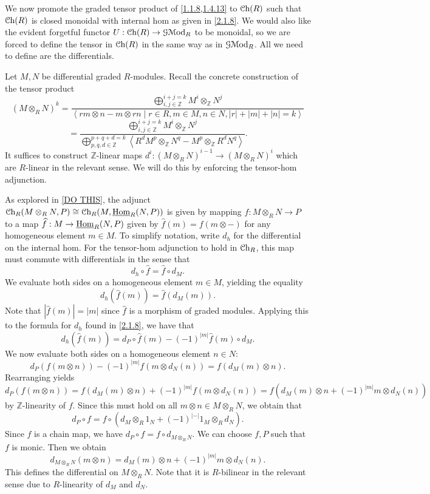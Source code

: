 \begin{construction}\label{2.1.10}
	We now promote the graded tensor product of \cref{1.1.8,1.4.13} to $\mathcal{C}\mathrm{h}(R) $ such that $\mathcal{C}\mathrm{h}(R) $ is closed monoidal with internal hom as given in \cref{2.1.8}. We would also like the evident forgetful functor $U : \mathcal{C}\mathrm{h}(R)  \to \mathcal{G} \mathcal{M}\mathrm{od} _R$ to be monoidal, so we are forced to define the tensor in $\mathcal{C}\mathrm{h}(R) $ in the same way as in $\mathcal{G} \mathcal{M}\mathrm{od} _R$. All we need to define are the differentials.

	Let $M,N$ be differential graded $R$-modules. Recall the concrete construction of the tensor product
	\[
		\left( M\otimes _RN \right) ^k = \frac{\bigoplus_{i,j\in\mathbb{Z} } ^{i+j=k} M^i\otimes _\mathbb{Z} N^j}{\left\langle r m\otimes n - m\otimes rn\mid r\in R,m\in M,n\in N,\left| r \right| +\left| m \right| +\left| n \right| =k \right\rangle } 
	\]
	\[
		=\frac{\displaystyle{\bigoplus_{i,j\in\mathbb{Z} } ^{i+j=k} M^i\otimes _\mathbb{Z} N^j}}{\displaystyle{\bigoplus_{p,q,d\in \mathbb{Z} } ^{p+q+d=k} \left\langle R^dM^p\otimes _\mathbb{Z} N^q - M^p \otimes _\mathbb{Z} R^dN^q\right\rangle}} 
	.\]
	It suffices to construct $\mathbb{Z} $-linear maps $d^i : (M\otimes _RN)^{i-1}  \to (M\otimes _RN)^i$ which are $R$-linear in the relevant sense. We will do this by enforcing the tensor-hom adjunction.

	As explored in \cref{DO THIS}, the adjunct $\mathcal{C}\mathrm{h}_{R} (M\otimes _RN,P)\cong \mathcal{C}\mathrm{h}_{R} (M,\underline{\operatorname{Hom}}_{R}(N, P) )$ is given by mapping $f : M\otimes _RN \to P$ to a map $\widehat{f} : M \to \underline{\operatorname{Hom}}_{R}(N, P) $ given by $\widehat{f} (m)=f(m\otimes -)$ for any homogeneous element $m\in M$. To simplify notation, write $d_h$ for the differential on the internal hom. For the tensor-hom adjunction to hold in $\mathcal{C}\mathrm{h}_{R} $, this map must commute with differentials in the sense that
	\[
		d_{h} \circ \widehat{f} =\widehat{f} \circ d_M
	.\]
	We evaluate both sides on a homogeneous element $m\in M$, yielding the equality
	\[
		d_h(\widehat{f} (m)) = \widehat{f} (d_M(m))
	.\]
	Note that $\left| \widehat{f} (m) \right| =\left| m \right| $ since $\widehat{f} $ is a morphism of graded modules. Applying this to the formula for $d_h$ found in \cref{2.1.8}, we have that
	\[
		d_h(\widehat{f} (m)) = d_P\circ \widehat{f} (m) - (-1)^{\left| m \right| } \widehat{f} (m)\circ d_M
	.\]
	We now evaluate both sides on a homogeneous element $n\in N$:
	\[
		d_P(f(m\otimes n)) - (-1)^{\left| m \right| } f(m\otimes d_N(n)) = f(d_M(m)\otimes n)
	.\]
	Rearranging yields
	\[
		d_P(f(m\otimes n)) = f(d_M(m)\otimes n) + (-1)^{\left| m \right| } f(m\otimes d_N(n)) = f\left( d_M(m)\otimes n + (-1)^{\left| m \right| } m\otimes d_N(n) \right) 
	\]
	by $\mathbb{Z} $-linearity of $f$. Since this must hold on all $m\otimes n\in M\otimes _RN$, we obtain that
	\[
		d_P \circ f = f\circ \left(d_M \otimes _R1_N + (-1)^{\left| - \right| } 1_M \otimes _R d_N\right)
	.\]
	Since $f$ is a chain map, we have $d_P \circ f = f \circ d_{M\otimes_R N} $. We can choose $f,P$ such that $f$ is monic. Then we obtain
	\[
		d_{M\otimes _RN} (m\otimes n) = d_M(m) \otimes n + (-1)^{\left| m \right| } m\otimes d_N(n)
	.\]
	This defines the differential on $M\otimes _RN$. Note that it is $R$-bilinear in the relevant sense due to $R$-linearity of $d_M$ and $d_N$.
\end{construction}

